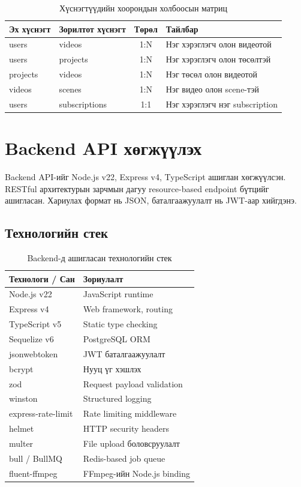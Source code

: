 \begin{table}[H]
\centering
\label{tab:relations}
\begin{tabular}{|l|l|c|p{4.5cm}|}
\hline
\textbf{Эх хүснэгт} & \textbf{Зорилтот хүснэгт} & \textbf{Төрөл} & \textbf{Тайлбар} \\
\hline
users & videos & 1:N & Нэг хэрэглэгч олон видеотой \\
\hline
users & projects & 1:N & Нэг хэрэглэгч олон төсөлтэй \\
\hline
projects & videos & 1:N & Нэг төсөл олон видеотой \\
\hline
videos & scenes & 1:N & Нэг видео олон scene-тэй \\
\hline
users & subscriptions & 1:1 & Нэг хэрэглэгч нэг subscription \\
\hline
\end{tabular}
\caption{Хүснэгтүүдийн хоорондын холбоосын матриц}
\end{table}



\section{Backend API хөгжүүлэх}

Backend API-ийг Node.js v22, Express v4, TypeScript ашиглан хөгжүүлсэн. RESTful архитектурын зарчмын дагуу resource-based endpoint бүтцийг ашигласан. Хариулах формат нь JSON, баталгаажуулалт нь JWT-аар хийгдэнэ.

\subsection{Технологийн стек}

\begin{table}[H]
\centering
\label{tab:backend_stack}
\begin{tabular}{|l|p{8cm}|}
\hline
\textbf{Технологи / Сан} & \textbf{Зориулалт} \\
\hline
Node.js v22 & JavaScript runtime \\
\hline
Express v4 & Web framework, routing \\
\hline
TypeScript v5 & Static type checking \\
\hline
Sequelize v6 & PostgreSQL ORM \\
\hline
jsonwebtoken & JWT баталгаажуулалт \\
\hline
bcrypt & Нууц үг хэшлэх \\
\hline
zod & Request payload validation \\
\hline
winston & Structured logging \\
\hline
express-rate-limit & Rate limiting middleware \\
\hline
helmet & HTTP security headers \\
\hline
multer & File upload боловсруулалт \\
\hline
bull / BullMQ & Redis-based job queue \\
\hline
fluent-ffmpeg & FFmpeg-ийн Node.js binding \\
\hline
\end{tabular}
\caption{Backend-д ашигласан технологийн стек}
\end{table}

